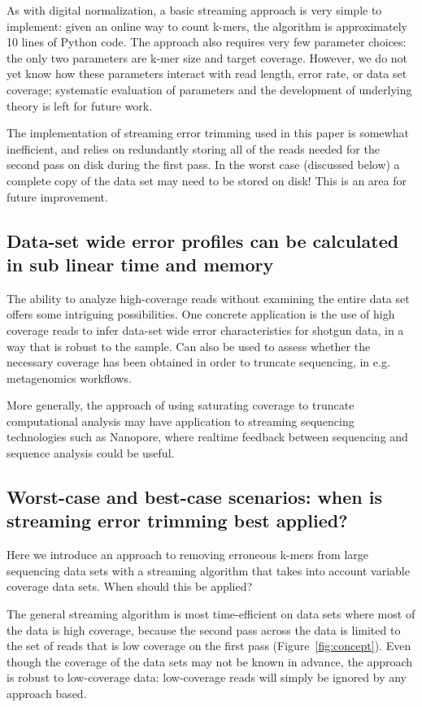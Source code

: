 \documentclass{article}
\begin{document}
As with digital normalization, a basic streaming approach is very
simple to implement: given an online way to count k-mers, the
algorithm is approximately 10 lines of Python code.  The approach also
requires very few parameter choices: the only two parameters are k-mer
size and target coverage.  However, we do not yet know how these
parameters interact with read length, error rate, or data set
coverage; systematic evaluation of parameters and the development of
underlying theory is left for future work.

The implementation of streaming error trimming used in this paper is
somewhat inefficient, and relies on redundantly storing all of the
reads needed for the second pass on disk during the first pass.  In
the worst case (discussed below) a complete copy of the data set may
need to be stored on disk!  This is an area for future improvement.

\subsection{Data-set wide error profiles can be calculated in sub linear time and memory}

The ability to analyze high-coverage reads without examining the
entire data set offers some intriguing possibilities.  One concrete
application is the use of high coverage reads to infer data-set wide
error characteristics for shotgun data, in a way that is robust to the
sample.  Can also be used to assess whether the necessary coverage has
been obtained in order to truncate sequencing, in e.g. metagenomics
workflows.

More generally, the approach of using saturating coverage to truncate
computational analysis may have application to streaming sequencing
technologies such as Nanopore, where realtime feedback between
sequencing and sequence analysis could be useful.

\subsection{Worst-case and best-case scenarios: when is streaming error
trimming best applied?}

Here we introduce an approach to removing erroneous k-mers from large
sequencing data sets with a streaming algorithm that takes into
account variable coverage data sets.  When should this be applied?

The general streaming algorithm is most time-efficient on data sets
where most of the data is high coverage, because the second pass
across the data is limited to the set of reads that is low coverage on
the first pass (Figure~\ref{fig:concept}).  Even though the coverage
of the data sets may not be known in advance, the approach is robust
to low-coverage data: low-coverage reads will simply be ignored by any
approach based.
\end{document}
